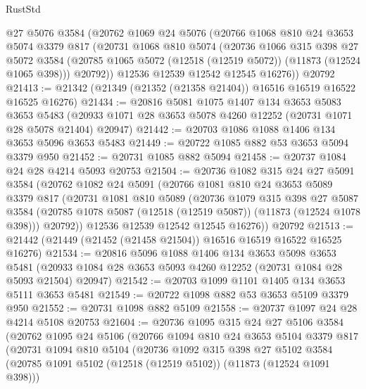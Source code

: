 \begin{lexlean}{RustStd}
\begin{coremodule}
    @27
    @5076
    @3584
    (@20762
      @1069
      @24
      @5076
      (@20766
        @1068
        @810
        @24
        @3653
        @5074
        @3379
        @817
        (@20731
          @1068
          @810
          @5074
          (@20736
            @1066
            @315
            @398
            @27
            @5072
            @3584
            (@20785 @1065 @5072 (@12518 (@12519 @5072)) (@11873 (@12524 @1065 @398)))
            @20792))
        @12536
        @12539
        @12542
        @12545
        @16276))
    @20792
@21413 := @21342 (@21349 (@21352 (@21358 @21404)) @16516 @16519 @16522 @16525 @16276)
@21434 := @20816
    @5081
    @1075
    @1407
    @134
    @3653
    @5083
    @3653
    @5483
    (@20933 @1071 @28 @3653 @5078 @4260 @12252 (@20731 @1071 @28 @5078 @21404) @20947)
@21442 := @20703 @1086 @1088 @1406 @134 @3653 @5096 @3653 @5483
@21449 := @20722 @1085 @882 @53 @3653 @5094 @3379 @950
@21452 := @20731 @1085 @882 @5094
@21458 := @20737 @1084 @24 @28 @4214 @5093 @20753
@21504 := @20736
    @1082
    @315
    @24
    @27
    @5091
    @3584
    (@20762
      @1082
      @24
      @5091
      (@20766
        @1081
        @810
        @24
        @3653
        @5089
        @3379
        @817
        (@20731
          @1081
          @810
          @5089
          (@20736
            @1079
            @315
            @398
            @27
            @5087
            @3584
            (@20785 @1078 @5087 (@12518 (@12519 @5087)) (@11873 (@12524 @1078 @398)))
            @20792))
        @12536
        @12539
        @12542
        @12545
        @16276))
    @20792
@21513 := @21442 (@21449 (@21452 (@21458 @21504)) @16516 @16519 @16522 @16525 @16276)
@21534 := @20816
    @5096
    @1088
    @1406
    @134
    @3653
    @5098
    @3653
    @5481
    (@20933 @1084 @28 @3653 @5093 @4260 @12252 (@20731 @1084 @28 @5093 @21504) @20947)
@21542 := @20703 @1099 @1101 @1405 @134 @3653 @5111 @3653 @5481
@21549 := @20722 @1098 @882 @53 @3653 @5109 @3379 @950
@21552 := @20731 @1098 @882 @5109
@21558 := @20737 @1097 @24 @28 @4214 @5108 @20753
@21604 := @20736
    @1095
    @315
    @24
    @27
    @5106
    @3584
    (@20762
      @1095
      @24
      @5106
      (@20766
        @1094
        @810
        @24
        @3653
        @5104
        @3379
        @817
        (@20731
          @1094
          @810
          @5104
          (@20736
            @1092
            @315
            @398
            @27
            @5102
            @3584
            (@20785 @1091 @5102 (@12518 (@12519 @5102)) (@11873 (@12524 @1091 @398)))

\end{coremodule}
\end{lexlean}
